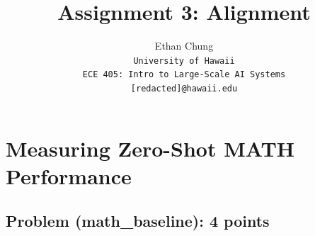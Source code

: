 \documentclass[letterpaper]{article}
\begin{document}
	\title{Assignment 3: Alignment}
	
	\author{Ethan Chung\\
		{\tt\small University of Hawaii}\\
		{\tt\small ECE 405: Intro to Large-Scale AI Systems}\\
		{\tt\small [redacted]@hawaii.edu}}
	
	\maketitle
	
	\tableofcontents
	
	\newpage
	
	\section{Measuring Zero-Shot MATH Performance}
	
	\subsection{Problem (math\_baseline): 4 points}
	
\end{document}
